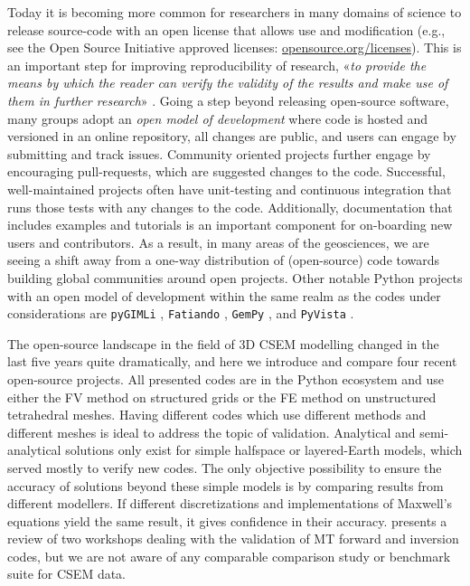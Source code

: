 \documentclass[
    paper,
  ]{geophysics}
\begin{document}
Today it is becoming more common for researchers in many domains of science to release source-code with an open license that allows use and modification (e.g., see the Open Source Initiative approved licenses: \href{https://opensource.org/licenses}{opensource.org/licenses}). This is an important step for improving reproducibility of research, «\emph{to provide the means by which the reader can verify the validity of the results and make use of them in further research}» \citep{GEO.17.Broggini}. Going a step beyond releasing open-source software, many groups adopt an \emph{open model of development} where code is hosted and versioned in an online repository, all changes are public, and users can engage by submitting and track issues. Community oriented projects further engage by encouraging pull-requests, which are suggested changes to the code. Successful, well-maintained projects often have unit-testing and continuous integration that runs those tests with any changes to the code. Additionally, documentation that includes examples and tutorials is an important component for on-boarding new users and contributors. As a result, in many areas of the geosciences, we are seeing a shift away from a one-way distribution of (open-source) code towards building global communities around open projects. Other notable Python projects with an open model of development within the same realm as the codes under considerations are \texttt{pyGIMLi} \citep{CAG.17.Rucker}, \texttt{Fatiando} \citep{JOSS.18.Uieda}, \texttt{GemPy} \citep{GMD.19.DeLaVarga}, and \texttt{PyVista} \citep{JOSS.19.Sullivan}.

The open-source landscape in the field of 3D CSEM modelling changed in the last five years quite dramatically, and here we introduce and compare four recent open-source projects. All presented codes are in the Python ecosystem and use either the FV method on structured grids or the FE method on unstructured tetrahedral meshes. Having different codes which use different methods and different meshes is ideal to address the topic of validation. Analytical and semi-analytical solutions only exist for simple halfspace or layered-Earth models, which served mostly to verify new codes. The only objective possibility to ensure the accuracy of solutions beyond these simple models is by comparing results from different modellers. If different discretizations and implementations of Maxwell's equations yield the same result, it gives confidence in their accuracy. \cite{GJI.13.Miensopust} presents a review of two workshops dealing with the validation of MT forward and inversion codes, but we are not aware of any comparable comparison study or benchmark suite for CSEM data.
\end{document}
